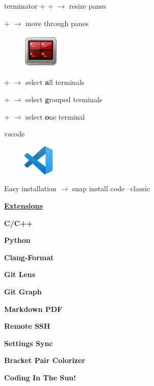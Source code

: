 \documentclass[10pt,a4paper]{article}
\begin{document}
\begin{multicols}{3}
\begin{textbox}{terminator}
 $+$  $+$ \keystroke{$\leftarrow$}\keystroke{$\uparrow$}\keystroke{$\downarrow$}\keystroke{$\rightarrow$} $\rightarrow$ resize panes

 $+$ \keystroke{$\leftarrow$}\keystroke{$\uparrow$}\keystroke{$\downarrow$}\keystroke{$\rightarrow$} $\rightarrow$ move through panes

\begin{figure}
 \vspace{-4mm}\includegraphics[width=0.15\textwidth]{images/icon_terminator.png}
\end{figure}

 $+$  $\rightarrow$ select \textbf{a}ll terminals

 $+$  $\rightarrow$ select \textbf{g}rouped terminals

 $+$  $\rightarrow$ select \textbf{o}ne terminal


\end{textbox}



\begin{textbox}{vscode}




\begin{figure}
 \vspace{-10mm}\includegraphics[width=0.13\textwidth]{images/Visual_Studio_Code_1.35_icon.svg.png}
\end{figure}


Easy installation $\rightarrow$ snap install code --classic

\underline{\textbf{Extensions }}
\begin{itemize}
\begin{multicols}{2}

    \item \textbf{C/C++}
    \item \textbf{Python}
    \item \textbf{Clang-Format}
    \item \textbf{Git Lens}
    \item \textbf{Git Graph}
    \item \textbf{Markdown PDF}
    \item \textbf{Remote SSH}
    \item \textbf{Settings Sync}
    \item \textbf{Bracket Pair Colorizer}
    \item \textbf{Coding In The Sun!} 
\end{multicols}
\end{itemize}



\end{textbox}
\end{multicols}
\end{document}
